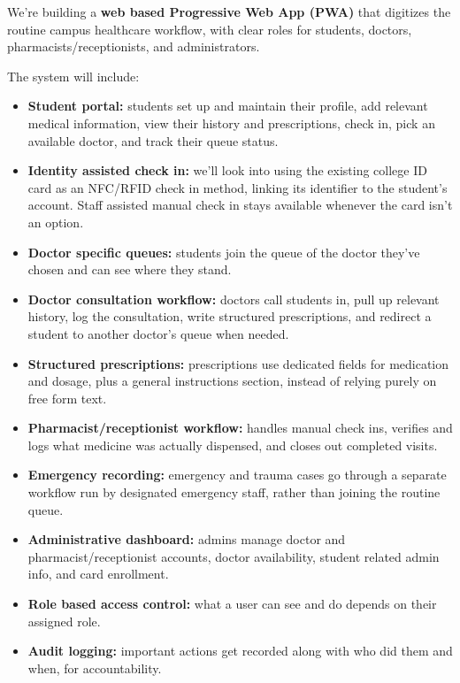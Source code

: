 \documentclass[11pt,a4paper]{article}
\begin{document}
We're building a \textbf{web based Progressive Web App (PWA)} that digitizes the routine campus healthcare workflow, with clear roles for students, doctors, pharmacists/receptionists, and administrators.

The system will include:

\begin{itemize}
    \item \textbf{Student portal:} students set up and maintain their profile, add relevant medical information, view their history and prescriptions, check in, pick an available doctor, and track their queue status.
    \item \textbf{Identity assisted check in:} we'll look into using the existing college ID card as an NFC/RFID check in method, linking its identifier to the student's account. Staff assisted manual check in stays available whenever the card isn't an option.
    \item \textbf{Doctor specific queues:} students join the queue of the doctor they've chosen and can see where they stand.
    \item \textbf{Doctor consultation workflow:} doctors call students in, pull up relevant history, log the consultation, write structured prescriptions, and redirect a student to another doctor's queue when needed.
    \item \textbf{Structured prescriptions:} prescriptions use dedicated fields for medication and dosage, plus a general instructions section, instead of relying purely on free form text.
    \item \textbf{Pharmacist/receptionist workflow:} handles manual check ins, verifies and logs what medicine was actually dispensed, and closes out completed visits.
    \item \textbf{Emergency recording:} emergency and trauma cases go through a separate workflow run by designated emergency staff, rather than joining the routine queue.
    \item \textbf{Administrative dashboard:} admins manage doctor and pharmacist/receptionist accounts, doctor availability, student related admin info, and card enrollment.
    \item \textbf{Role based access control:} what a user can see and do depends on their assigned role.
    \item \textbf{Audit logging:} important actions get recorded along with who did them and when, for accountability.
\end{itemize}
\end{document}
